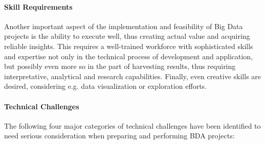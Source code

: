 \paragraph{Skill Requirements}
Another important aspect of the implementation and feasibility of Big Data projects is the ability to execute well, thus creating actual value and acquiring reliable insights. This requires a well-trained workforce with sophisticated skills and expertise not only in the technical process of development and application, but possibly even more so in the part of harvesting results, thus requiring interpretative, analytical and research capabilities. Finally, even creative skills are desired, considering e.g. data visualization or exploration efforts.

\paragraph{Technical Challenges}
The following four major categories of technical challenges have been identified to need serious consideration when preparing and performing \ac{BDA} projects:

